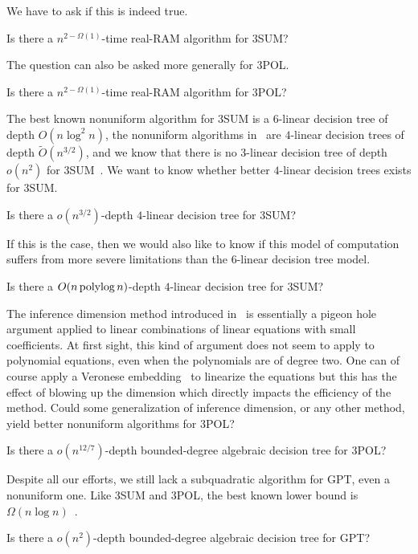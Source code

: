 We have to ask if this is indeed true.
\begin{openquestion}
	Is there a \(n^{2-\Omega(1)}\)-time real-RAM algorithm for 3SUM?
\end{openquestion}

The question can also be asked more generally for 3POL.
\begin{openquestion}
	Is there a \(n^{2-\Omega(1)}\)-time real-RAM algorithm for 3POL?
\end{openquestion}

The best known nonuniform algorithm for 3SUM is a \(6\)-linear decision tree of
depth \(O(n \log^2 n)\), the nonuniform algorithms in~\cite{GP18,Fr15,GS15} are
\(4\)-linear decision trees of depth \( \tilde{O}(n^{3/2}) \), and we know that
there is no \(3\)-linear decision tree of depth \(o(n^2)\) for
3SUM~\cite{Er99a}.
We want to know whether better \(4\)-linear decision trees exists for 3SUM.
\begin{openquestion}
	Is there a \(o(n^{3/2})\)-depth \(4\)-linear decision tree for 3SUM?
\end{openquestion}

If this is the case, then we would also like to know if this model of
computation suffers from more severe limitations than the \(6\)-linear decision tree
model.
\begin{openquestion}
	Is there a \(O(n \operatorname{polylog} n)\)-depth \(4\)-linear decision tree for 3SUM?
\end{openquestion}

The inference dimension method introduced in~\cite{KLM18} is essentially a
pigeon hole argument applied to linear combinations of linear equations with small coefficients.
At first sight, this kind of argument does not seem to apply to polynomial
equations, even when the polynomials are of degree two. One can of course apply
a Veronese embedding~\cite{Har77,Har13} to linearize the equations but this has
the effect of blowing up the dimension which directly impacts the efficiency of
the method. Could some generalization of inference dimension, or any other
method, yield better nonuniform algorithms for 3POL?
\begin{openquestion}
	Is there a \(o(n^{12/7})\)-depth bounded-degree algebraic decision tree for
	3POL?
\end{openquestion}

Despite all our efforts, we still lack a subquadratic algorithm for GPT, even a
nonuniform one. Like 3SUM and 3POL, the best known lower bound is \(\Omega(n
\log n)\)~\cite{???}.
\begin{openquestion}
	Is there a \(o(n^2)\)-depth bounded-degree algebraic decision tree for
	GPT?
\end{openquestion}


